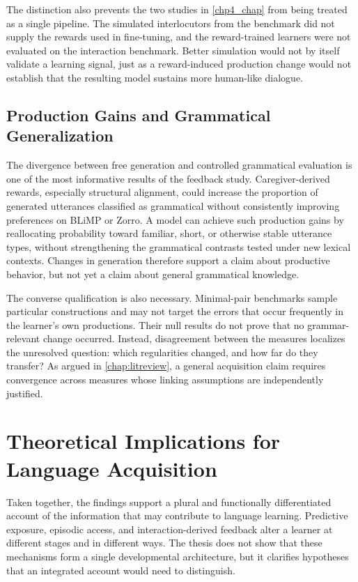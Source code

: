 The distinction also prevents the two studies in \cref{chp4_chap} from being treated as a single pipeline. The simulated interlocutors from the benchmark did not supply the rewards used in fine-tuning, and the reward-trained learners were not evaluated on the interaction benchmark. Better simulation would not by itself validate a learning signal, just as a reward-induced production change would not establish that the resulting model sustains more human-like dialogue.

\subsection{Production Gains and Grammatical Generalization}

The divergence between free generation and controlled grammatical evaluation is one of the most informative results of the feedback study. Caregiver-derived rewards, especially structural alignment, could increase the proportion of generated utterances classified as grammatical without consistently improving preferences on BLiMP or Zorro. A model can achieve such production gains by reallocating probability toward familiar, short, or otherwise stable utterance types, without strengthening the grammatical contrasts tested under new lexical contexts. Changes in generation therefore support a claim about productive behavior, but not yet a claim about general grammatical knowledge.

The converse qualification is also necessary. Minimal-pair benchmarks sample particular constructions and may not target the errors that occur frequently in the learner's own productions. Their null results do not prove that no grammar-relevant change occurred. Instead, disagreement between the measures localizes the unresolved question: which regularities changed, and how far do they transfer? As argued in \cref{chap:litreview}, a general acquisition claim requires convergence across measures whose linking assumptions are independently justified.

\section{Theoretical Implications for Language Acquisition}
\label{sec:gd_theory}

Taken together, the findings support a plural and functionally differentiated account of the information that may contribute to language learning. Predictive exposure, episodic access, and interaction-derived feedback alter a learner at different stages and in different ways. The thesis does not show that these mechanisms form a single developmental architecture, but it clarifies hypotheses that an integrated account would need to distinguish.

